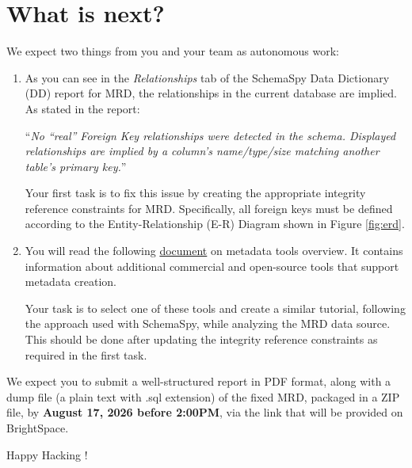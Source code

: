 \documentclass{article}
\begin{document}
\section{What is next?}

We expect two things from you and your team as autonomous work:

\begin{enumerate}
    \item As you can see in the \textit{Relationships} tab of the SchemaSpy Data Dictionary (DD) report for MRD, the relationships in the current database are implied. As stated in the report:

    ``\textit{No ``real'' Foreign Key relationships were detected in the schema. Displayed relationships are implied by a column's name/type/size matching another table's primary key.}''

    Your first task is to fix this issue by creating the appropriate integrity reference constraints for MRD. Specifically, all foreign keys must be defined according to the Entity-Relationship (E-R) Diagram shown in Figure \ref{fig:erd}.

    \item You will read the following \href{https://drive.google.com/file/d/1jqnAJ4A3AfnrTHHuYTcmOlaBXnUAznP1/view?usp=drive_link}{document} on metadata tools overview. It contains information about additional commercial and open-source tools that support metadata creation.

    Your task is to select one of these tools and create a similar tutorial, following the approach used with SchemaSpy, while analyzing the MRD data source. This should be done after updating the integrity reference constraints as required in the first task.
\end{enumerate}

We expect you to submit a well-structured report in PDF format, along with a dump file (a plain text with .sql extension) of the fixed MRD, packaged in a ZIP file, by \textbf{August 17, 2026 before 2:00PM}, via the link that will be provided on BrightSpace\texttrademark.

\vspace{5mm}
Happy Hacking !
\end{document}
